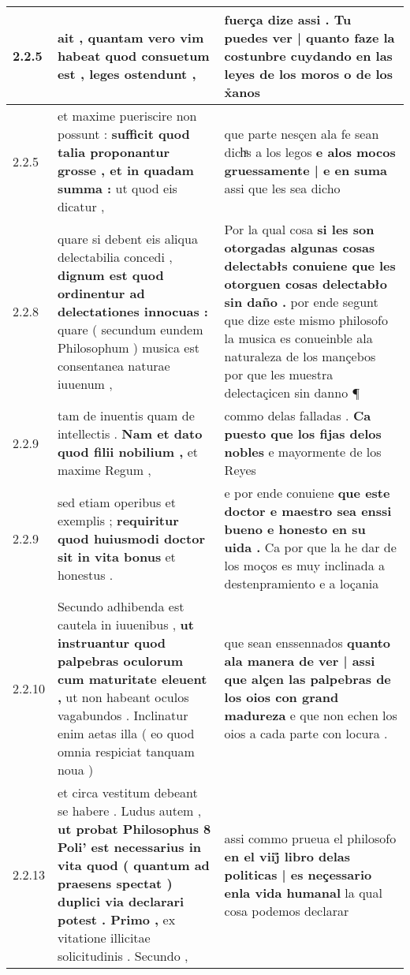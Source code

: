 \begin{tabular}{|p{1cm}|p{6.5cm}|p{6.5cm}|}
2.2.5 & ait , \textbf{ quantam vero vim habeat quod consuetum est , } leges ostendunt , & fuerça dize assi . \textbf{ Tu puedes ver | quanto faze la costunbre } cuydando en las leyes de los moros o de los x̉anos \\\hline
2.2.5 & et maxime pueriscire non possunt : \textbf{ sufficit quod talia proponantur grosse , et in quadam summa : } ut quod eis dicatur , & que parte nesçen ala fe sean dichͣs a los legos \textbf{ e alos mocos gruessamente | e en suma } assi que les sea dicho \\\hline
2.2.8 & quare si debent eis aliqua delectabilia concedi , \textbf{ dignum est quod ordinentur ad delectationes innocuas : } quare ( secundum eundem Philosophum ) musica est consentanea naturae iuuenum , & Por la qual cosa \textbf{ si les son otorgadas algunas cosas delectabłs conuiene que les otorguen cosas delectabło sin daño . } por ende segunt que dize este mismo philosofo la musica es conueinble ala naturaleza de los mançebos por que les muestra delectaçicen sin danno ¶ \\\hline
2.2.9 & tam de inuentis quam de intellectis . \textbf{ Nam et dato quod filii nobilium , } et maxime Regum , & commo delas falladas . \textbf{ Ca puesto que los fijas delos nobles } e mayormente de los Reyes \\\hline
2.2.9 & sed etiam operibus et exemplis ; \textbf{ requiritur quod huiusmodi doctor sit in vita bonus } et honestus . & e por ende conuiene \textbf{ que este doctor e maestro sea enssi bueno e honesto en su uida . } Ca por que la he dar de los moços es muy inclinada a destenpramiento e a loçania \\\hline
2.2.10 & Secundo adhibenda est cautela in iuuenibus , \textbf{ ut instruantur quod palpebras oculorum cum maturitate eleuent , } ut non habeant oculos vagabundos . Inclinatur enim aetas illa ( eo quod omnia respiciat tanquam noua ) & que sean enssennados \textbf{ quanto ala manera de ver | assi que alçen las palpebras de los oios con grand madureza } e que non echen los oios a cada parte con locura . \\\hline
2.2.13 & et circa vestitum debeant se habere . Ludus autem , \textbf{ ut probat Philosophus 8 Poli’ est necessarius in vita quod ( quantum ad praesens spectat ) duplici via declarari potest . Primo , } ex vitatione illicitae solicitudinis . Secundo , & assi commo prueua el philosofo \textbf{ en el viij̊ libro delas politicas | es neçessario enla vida humanal } la qual cosa podemos declarar \\\hline

\end{tabular}
